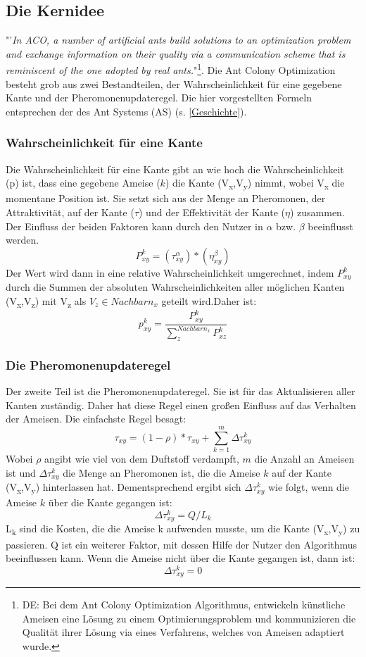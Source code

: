 \documentclass[12pt]{article}
\begin{document}
\subsection{Die Kernidee}\label{Kernidee}
"'\textit{In ACO, a number of artificial ants build solutions to an optimization problem and exchange information on their quality via a communication scheme that is reminiscent of the one adopted by real ants.}"\cite{ dorigo2007ant}\footnote{DE: Bei dem Ant Colony Optimization Algorithmus, entwickeln künstliche Ameisen eine Lösung zu einem Optimierungsproblem und kommunizieren die Qualität ihrer Lösung via eines Verfahrens, welches von Ameisen adaptiert wurde.  }. 
Die Ant Colony Optimization besteht grob aus zwei Bestandteilen, der Wahrscheinlichkeit für eine gegebene Kante und der Pheromonenupdateregel. Die hier vorgestellten Formeln entsprechen der des Ant Systems (AS) (s. \ref{Geschichte}).
\subsubsection{Wahrscheinlichkeit für eine Kante}\label{P/p}
Die Wahrscheinlichkeit für eine Kante gibt an wie hoch die Wahrscheinlichkeit (p) ist, dass eine gegebene Ameise ($k$) die Kante (V\textsubscript{x},V\textsubscript{y}) nimmt, wobei V\textsubscript{x} die momentane Position ist. Sie setzt sich aus der Menge an Pheromonen, der Attraktivität,  auf der Kante ($\tau$) und der Effektivität der Kante ($\eta$) zusammen. Der Einfluss der beiden Faktoren kann durch den Nutzer in $\alpha$ bzw. $\beta$ beeinflusst werden. \[ P ^{ k }_{ xy }=\left(  \tau ^{ \alpha }_{ xy } \right)*\left(  \eta ^{ \beta }_{ xy } \right)\]
Der Wert wird dann in eine relative Wahrscheinlichkeit umgerechnet, indem $P^k_{xy}$ durch die Summen der absoluten Wahrscheinlichkeiten aller möglichen Kanten (V\textsubscript{x},V\textsubscript{z}) mit V\textsubscript{z} als $V_z \in Nachbarn_{x}$ geteilt wird.Daher ist: \[p^{k}_{xy}=\frac{P^k_{xy}}{\sum_{z}^{Nachbarn_{x}}{P^{k }_{xz}}} \]
\subsubsection{Die Pheromonenupdateregel}
Der zweite Teil ist die Pheromonenupdateregel. Sie ist für das Aktualisieren aller Kanten zuständig. Daher hat diese Regel einen großen Einfluss auf das Verhalten der Ameisen. Die einfachste Regel besagt: \[\tau_{xy}= (1-\rho)*\tau_{xy}+\sum_{k=1}^{m}{ \Delta\tau^k_{xy}} \]
Wobei $\rho$ angibt wie viel von dem Duftstoff verdampft, $m$ die Anzahl an Ameisen ist und $\Delta\tau^k_{xy}$ die Menge an Pheromonen ist, die die Ameise $k$ auf der Kante (V\textsubscript{x},V\textsubscript{y}) hinterlassen hat. Dementsprechend ergibt sich $\Delta\tau^k_{xy}$ wie folgt, wenn die Ameise $k$ über die Kante gegangen ist:\[\Delta\tau^k_{xy}=Q/L_k\] L\textsubscript{k} sind die Kosten, die die Ameise k aufwenden musste, um die Kante (V\textsubscript{x},V\textsubscript{y}) zu passieren. Q ist ein weiterer Faktor, mit dessen Hilfe der Nutzer den Algorithmus beeinflussen kann. Wenn die Ameise nicht über die Kante gegangen ist, dann ist: \[\Delta\tau^k_{xy}=0\]
\pagebreak
\end{document}
